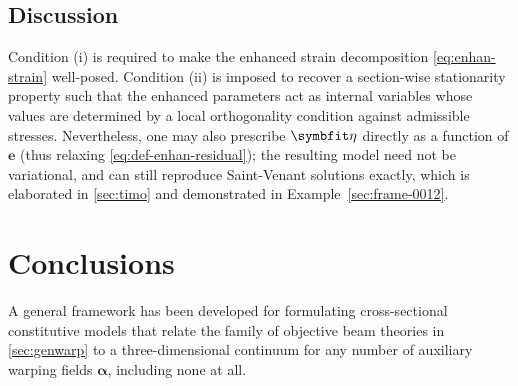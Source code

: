 \subsection{Discussion}

Condition (i) is required to make the enhanced strain decomposition \eqref{eq:enhan-strain} well-posed. 
Condition (ii) is imposed to recover a section-wise stationarity property such that the enhanced parameters act as internal variables whose values are determined by a local orthogonality condition against admissible stresses. 
Nevertheless, one may also prescribe $\bm{\EnhanParam}$ directly as a function of $\bm{e}$ (thus relaxing \eqref{eq:def-enhan-residual}); the resulting model need not be variational, and can still reproduce Saint-Venant solutions exactly, which is elaborated in \cref{sec:timo} and demonstrated in Example~\ref{sec:frame-0012}.





\section{Conclusions}

A general framework has been developed for formulating cross-sectional constitutive models that relate the family of objective beam theories in \cref{sec:genwarp} to a three-dimensional continuum for any number of auxiliary warping fields \(\bm{\alpha}\), including none at all. 


